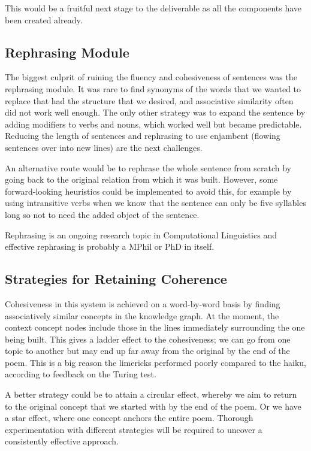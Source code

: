This would be a fruitful next stage to the deliverable as all the components have been created already.

\subsection{Rephrasing Module}
The biggest culprit of ruining the fluency and cohesiveness of sentences was the rephrasing module. It was rare to find synonyms of the words that we wanted to replace that had the structure that we desired, and associative similarity often did not work well enough. The only other strategy was to expand the sentence by adding modifiers to verbs and nouns, which worked well but became predictable. Reducing the length of sentences and rephrasing to use enjambent (flowing sentences over into new lines) are the next challenges. 

An alternative route would be to rephrase the whole sentence from scratch by going back to the original relation from which it was built. However, some forward-looking heuristics could be implemented to avoid this, for example by using intransitive verbs when we know that the sentence can only be five syllables long so not to need the added object of the sentence.

Rephrasing is an ongoing research topic in Computational Linguistics and effective rephrasing is probably a MPhil or PhD in itself.

\subsection{Strategies for Retaining Coherence} 

Cohesiveness in this system is achieved on a word-by-word basis by finding associatively similar concepts in the knowledge graph. At the moment, the context concept nodes include those in the lines immediately surrounding the one being built. This gives a ladder effect to the cohesiveness; we can go from one topic to another but may end up far away from the original by the end of the poem. This is a big reason the limericks performed poorly compared to the haiku, according to feedback on the Turing test.

A better strategy could be to attain a circular effect, whereby we aim to return to the original concept that we started with by the end of the poem. Or we have a star effect, where one concept anchors the entire poem. Thorough experimentation with different strategies will be required to uncover a consistently effective approach.

